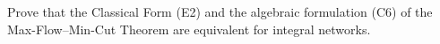 Prove that the Classical Form (E2) and the algebraic formulation (C6) of the Max-Flow–Min-Cut Theorem are equivalent for integral networks.
